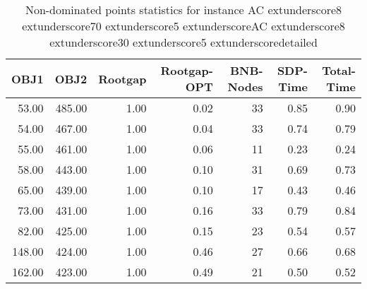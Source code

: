 \begin{table}
\caption{Non-dominated points statistics for instance AC	extunderscore8	extunderscore70	extunderscore5	extunderscoreAC	extunderscore8	extunderscore30	extunderscore5	extunderscoredetailed}
\label{tab:plots/AC_8_70_5_AC_8_30_5_detailed}
\begin{tabular}{rrrrrrr}
\toprule
OBJ1 & OBJ2 & Rootgap & Rootgap-OPT & BNB-Nodes & SDP-Time & Total-Time \\
\midrule
53.00 & 485.00 & 1.00 & 0.02 & 33 & 0.85 & 0.90 \\
54.00 & 467.00 & 1.00 & 0.04 & 33 & 0.74 & 0.79 \\
55.00 & 461.00 & 1.00 & 0.06 & 11 & 0.23 & 0.24 \\
58.00 & 443.00 & 1.00 & 0.10 & 31 & 0.69 & 0.73 \\
65.00 & 439.00 & 1.00 & 0.10 & 17 & 0.43 & 0.46 \\
73.00 & 431.00 & 1.00 & 0.16 & 33 & 0.79 & 0.84 \\
82.00 & 425.00 & 1.00 & 0.15 & 23 & 0.54 & 0.57 \\
148.00 & 424.00 & 1.00 & 0.46 & 27 & 0.66 & 0.68 \\
162.00 & 423.00 & 1.00 & 0.49 & 21 & 0.50 & 0.52 \\
\bottomrule
\end{tabular}
\end{table}
